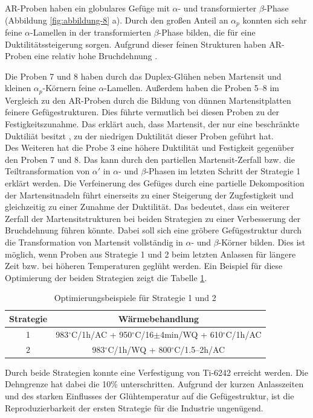 AR-Proben haben ein globulares Gefüge mit $\alpha$- und transformierter $\beta$-Phase (Abbildung \ref{fig:abbildung-8} a). Durch den großen Anteil an $\alpha_p$ konnten sich sehr feine $\alpha$-Lamellen in der transformierten $\beta$-Phase bilden, die für eine Duktilitätssteigerung sorgen. Aufgrund dieser feinen Strukturen haben AR-Proben eine relativ hohe Bruchdehnung \cite{Lutjering.2007}.

Die Proben 7 und 8 haben durch das Duplex-Glühen neben Martensit und kleinen $\alpha_p$-Körnern feine $\alpha$-Lamellen. Außerdem haben die Proben 5--8 im Vergleich zu den AR-Proben durch die Bildung von dünnen Martensitplatten feinere Gefügestrukturen. Dies führte vermutlich bei diesen Proben zu der Festigkeitszunahme. Das erklärt auch, dass Martensit, der nur eine beschränkte Duktiliät besitzt \cite{Lutjering.2007}, zu der niedrigen Duktilität dieser Proben geführt hat.\\
Des Weiteren hat die Probe 3 eine höhere Duktilität und Festigkeit gegenüber den Proben 7 und 8. Das kann durch den partiellen Martensit-Zerfall bzw. die Teiltransformation von $\alpha'$ in $\alpha$- und $\beta$-Phasen im letzten Schritt der Strategie 1 erklärt werden. Die Verfeinerung des Gefüges durch eine partielle Dekomposition der Martensitnadeln führt einerseits zu einer Steigerung der  Zugfestigkeit  und gleichzeitig zu einer Zunahme der Duktilität. 
Das bedeutet, dass ein weiterer Zerfall der Martensitstrukturen bei beiden Strategien zu einer Verbesserung der Bruchdehnung führen könnte. Dabei soll sich eine gröbere Gefügestruktur durch die Transformation von Martensit vollständig in $\alpha$- und $\beta$-Körner bilden. Dies ist möglich, wenn Proben aus Strategie 1 und 2 beim letzten Anlassen für längere Zeit bzw. bei höheren Temperaturen geglüht werden. Ein Beispiel für diese Optimierung der beiden Strategien zeigt die Tabelle \ref{wBZ}.



\begin{table}[h]
	\centering
	\begin{tabular}{|c|c|}
		\hline 
		Strategie & Wärmebehandlung \\ 
		\hline 
		1 & 983$^\circ$C/1h/AC + 950$^\circ$C/16$\pm $4min/WQ + 610$^\circ$C/1h/AC\\ 
		\hline 
		2 &  983$^\circ$C/1h/WQ + 800$^\circ$C/1.5--2h/AC \\ 
		\hline 
	\end{tabular} 
	\caption{Optimierungsbeispiele für Strategie 1 und 2}
	\label{wBZ}
	
	
\end{table}

Durch beide Strategien konnte eine Verfestigung von Ti-6242 erreicht werden. Die Dehngrenze hat dabei  die 10\% unterschritten. 
Aufgrund der kurzen Anlasszeiten und des starken Einflusses der Glühtemperatur auf die Gefügestruktur, ist die Reproduzierbarkeit der ersten Strategie für die Industrie ungenügend.















